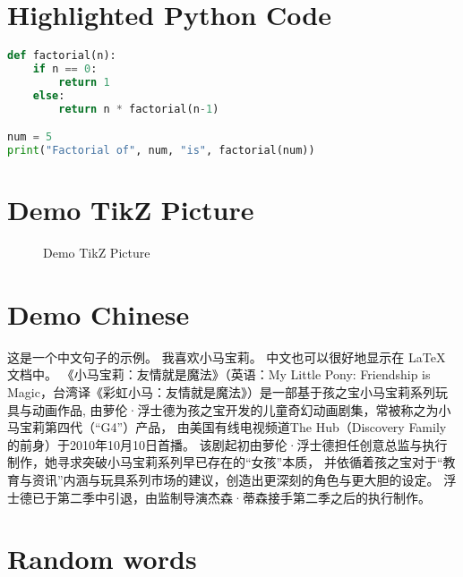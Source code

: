 \documentclass{article}
\begin{document}
\section{Highlighted Python Code}
\lipsum[7]
\begin{lstlisting}[language=Python, caption=Python Code, label=lst:python-code]
def factorial(n):
    if n == 0:
        return 1
    else:
        return n * factorial(n-1)

num = 5
print("Factorial of", num, "is", factorial(num))
\end{lstlisting}


\section{Demo TikZ Picture}
\lipsum[8]
\begin{figure}[h]
	\centering
	\caption{Demo TikZ Picture}
	\label{fig:demo-tikz}
\end{figure}
\section{Demo Chinese}
这是一个中文句子的示例。
我喜欢小马宝莉。
中文也可以很好地显示在 LaTeX 文档中。
《小马宝莉：友情就是魔法》（英语：My Little Pony: Friendship is Magic，台湾译《彩虹小马：友情就是魔法》）是一部基于孩之宝小马宝莉系列玩具与动画作品,
由萝伦·浮士德为孩之宝开发的儿童奇幻动画剧集，常被称之为小马宝莉第四代（“G4”）产品，
由美国有线电视频道The Hub（Discovery Family的前身）于2010年10月10日首播。
该剧起初由萝伦·浮士德担任创意总监与执行制作，她寻求突破小马宝莉系列早已存在的“女孩”本质，
并依循着孩之宝对于“教育与资讯”内涵与玩具系列市场的建议，创造出更深刻的角色与更大胆的设定。
浮士德已于第二季中引退，由监制导演杰森·蒂森接手第二季之后的执行制作。
\section{Random words}
\lipsum[9-40]
\end{document}
